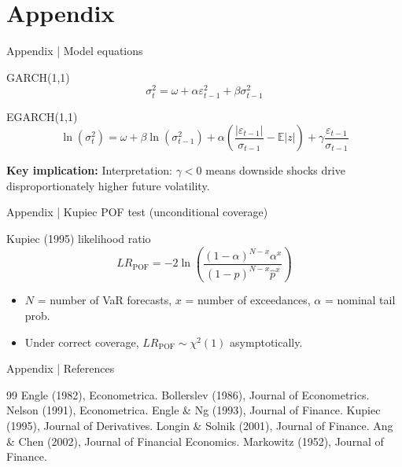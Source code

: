 \documentclass[aspectratio=169,10pt]{beamer}
\newcommand{\imp}{\textbf{Key implication:} }
\begin{document}
\appendix
\section*{Appendix}

\begin{frame}{Appendix | Model equations}
\small
\begin{block}{GARCH(1,1)}
\[
\sigma_t^2 = \omega + \alpha \varepsilon_{t-1}^2 + \beta \sigma_{t-1}^2
\]
\end{block}

\begin{block}{EGARCH(1,1)}
\[
\ln(\sigma_t^2) = \omega + \beta \ln(\sigma_{t-1}^2)
+ \alpha \left(\frac{|\varepsilon_{t-1}|}{\sigma_{t-1}} - \mathbb{E}|z|\right)
+ \gamma \frac{\varepsilon_{t-1}}{\sigma_{t-1}}
\]
\end{block}

\imp Interpretation: $\gamma<0$ means downside shocks drive disproportionately higher future volatility.
\end{frame}

\begin{frame}{Appendix | Kupiec POF test (unconditional coverage)}
\small
\begin{block}{Kupiec (1995) likelihood ratio}
\[
LR_{\mathrm{POF}} = -2 \ln
\left(
\frac{(1-\alpha)^{N-x} \alpha^x}
{(1-\hat{p})^{N-x} \hat{p}^x}
\right)
\]
\end{block}

\begin{itemize}
  \item $N$ = number of VaR forecasts, $x$ = number of exceedances, $\alpha$ = nominal tail prob.
  \item Under correct coverage, $LR_{\mathrm{POF}} \sim \chi^2(1)$ asymptotically.
\end{itemize}
\end{frame}

\begin{frame}{Appendix | References}
\small
\begin{thebibliography}{99}
 Engle (1982), Econometrica.
 Bollerslev (1986), Journal of Econometrics.
 Nelson (1991), Econometrica.
 Engle \& Ng (1993), Journal of Finance.
 Kupiec (1995), Journal of Derivatives.
 Longin \& Solnik (2001), Journal of Finance.
 Ang \& Chen (2002), Journal of Financial Economics.
 Markowitz (1952), Journal of Finance.
\end{thebibliography}
\end{frame}
\end{document}
